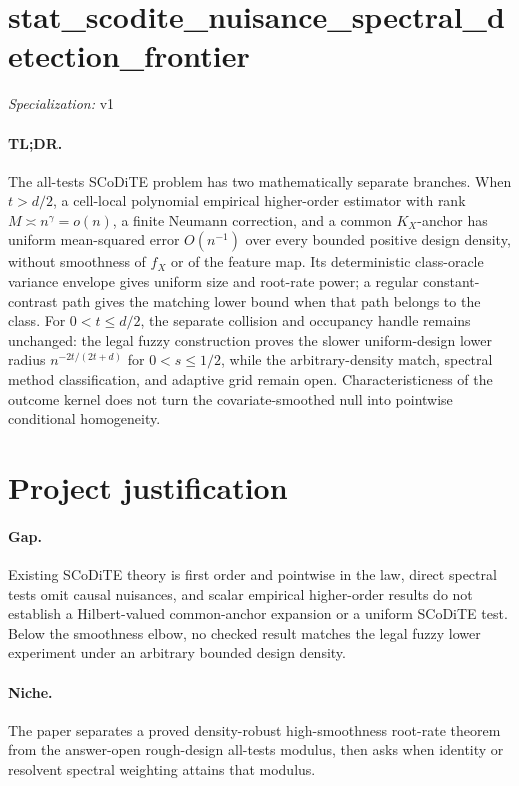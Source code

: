 \documentclass{article}
\begin{document}
\sloppy

\section*{stat\_\allowbreak{}scodite\_\allowbreak{}nuisance\_\allowbreak{}spectral\_\allowbreak{}detection\_\allowbreak{}frontier}

\noindent\textit{Specialization:} v1\par

\paragraph{TL;DR.} The all-tests SCoDiTE problem has two mathematically separate branches. When \(t>d/2\), a cell-local polynomial empirical higher-order estimator with rank \(M\asymp n^\gamma=o(n)\), a finite Neumann correction, and a common \(K_X\)-anchor has uniform mean-squared error \(O(n^{-1})\) over every bounded positive design density, without smoothness of \(f_X\) or of the feature map. Its deterministic class-oracle variance envelope gives uniform size and root-rate power; a regular constant-contrast path gives the matching lower bound when that path belongs to the class. For \(0<t\le d/2\), the separate collision and occupancy handle remains unchanged: the legal fuzzy construction proves the slower uniform-design lower radius \(n^{-2t/(2t+d)}\) for \(0<s\le1/2\), while the arbitrary-density match, spectral method classification, and adaptive grid remain open. Characteristicness of the outcome kernel does not turn the covariate-smoothed null into pointwise conditional homogeneity.

\section{Project justification}

\paragraph{Gap.} Existing SCoDiTE theory is first order and pointwise in the law, direct spectral tests omit causal nuisances, and scalar empirical higher-order results do not establish a Hilbert-valued common-anchor expansion or a uniform SCoDiTE test. Below the smoothness elbow, no checked result matches the legal fuzzy lower experiment under an arbitrary bounded design density.

\paragraph{Niche.} The paper separates a proved density-robust high-smoothness root-rate theorem from the answer-open rough-design all-tests modulus, then asks when identity or resolvent spectral weighting attains that modulus.
\end{document}
